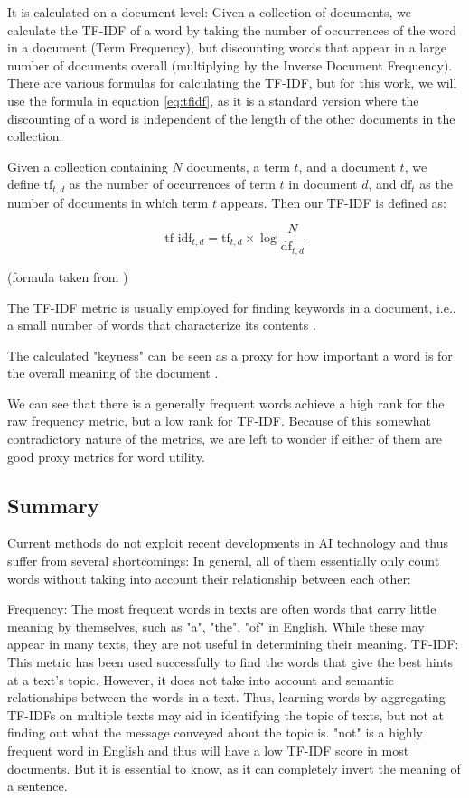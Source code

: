 It is calculated on a document level:
Given a collection of documents, we calculate the TF-IDF of a word by taking the number of occurrences of the word in a document (Term Frequency), but discounting words that appear in a large number of documents overall (multiplying by the Inverse Document Frequency).
There are various formulas for calculating the TF-IDF, but for this work, we will use the formula in equation \ref{eq:tfidf}, as it is a standard version where the discounting of a word is independent of the length of the other documents in the collection.

Given a collection containing $N$ documents, a term $t$, and a document $t$, we define $\text{tf}_{t,d}$ as the number of occurrences of term $t$ in document $d$, and $\text{df}_{t}$ as the number of documents in which term $t$ appears. Then our TF-IDF is defined as:

\begin{equation}\label{eq:tfidf}
	\text{tf-idf}_{t,d} = \text{tf}_{t,d} \times \log \frac{N}{\text{df}_{t,d}}
\end{equation}

(formula taken from \cite{qaiserTextMiningUse2018})


The TF-IDF metric is usually employed for finding keywords in a document, i.e., a small number of words that characterize its contents \cite{qaiserTextMiningUse2018}.

The calculated "keyness" can be seen as a proxy for how important a word is for the overall meaning of the document .

We can see that there is a generally frequent words achieve a high rank for the raw frequency metric, but a low rank for TF-IDF.
Because of this somewhat contradictory nature of the metrics, we are left to wonder if either of them are good proxy metrics for word utility.


\subsection{Summary}
Current methods do not exploit recent developments in AI technology and thus suffer from several shortcomings:
In general, all of them essentially only count words without taking into account their relationship between each other:

Frequency: The most frequent words in texts are often words that carry little meaning by themselves, such as "a", "the", "of" in English.
While these may appear in many texts, they are not useful in determining their meaning.
TF-IDF: This metric has been used successfully to find the words that give the best hints at a text's topic.
However, it does not take into account and semantic relationships between the words in a text.
Thus, learning words by aggregating TF-IDFs on multiple texts may aid in identifying the topic of texts, but not at finding out what the message conveyed about the topic is.
"not" is a highly frequent word in English and thus will have a low TF-IDF score in most documents. But it is essential to know, as it can completely invert the meaning of a sentence.


